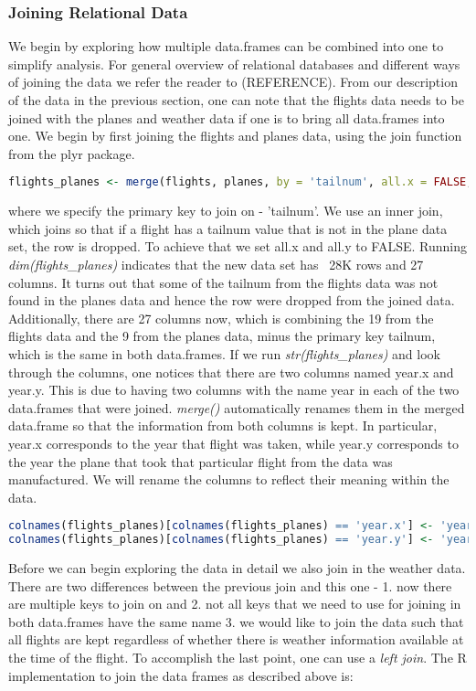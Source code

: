 \subsubsection{Joining Relational Data}
We begin by exploring how multiple data.frames can be combined into one to simplify analysis. For general overview of relational databases and different ways of joining the data we refer the reader to (REFERENCE). From our description of the data in the previous section, one can note that the flights data needs to be joined with the planes and weather data if one is to bring all data.frames into one. We begin by first joining the flights and planes data, using the join function from the plyr package.
\begin{lstlisting}[language=R]
flights_planes <- merge(flights, planes, by = 'tailnum', all.x = FALSE, all.y = FALSE)
\end{lstlisting}
where we specify the primary key to join on - 'tailnum'. We use an inner join, which joins so that if a flight has a tailnum value that is not in the plane data set, the row is dropped. To achieve that we set all.x and all.y to FALSE. Running \textit{dim(flights\_planes)} indicates that the new data set has ~28K rows and 27 columns. It turns out that some of the tailnum from the flights data was not found in the planes data and hence the row were dropped from the joined data. Additionally, there are 27 columns now, which is combining the 19 from the flights data and the 9 from the planes data, minus the primary key tailnum, which is the same in both data.frames. If we run \textit{str(flights\_planes)} and look through the columns, one notices that there are two columns named year.x and year.y. This is due to having two columns with the name year in each of the two data.frames that were joined. \textit{merge()} automatically renames them in the merged data.frame so that the information from both columns is kept. In particular, year.x corresponds to the year that flight was taken, while year.y corresponds to the year the plane that took that particular flight from the data was manufactured. We will rename the columns to reflect their meaning within the data.
\begin{lstlisting}[language=R]
colnames(flights_planes)[colnames(flights_planes) == 'year.x'] <- 'year'
colnames(flights_planes)[colnames(flights_planes) == 'year.y'] <- 'year_manufactured'
\end{lstlisting}
Before we can begin exploring the data in detail we also join in the weather data. There are two differences between the previous join and this one - 1. now there are multiple keys to join on and 2. not all keys that we need to use for joining in both data.frames have the same name 3. we would like to join the data such that all flights are kept regardless of whether there is weather information available at the time of the flight. To accomplish the last point, one can use a \textit{left join}. The R implementation to join the data frames as described above is:
